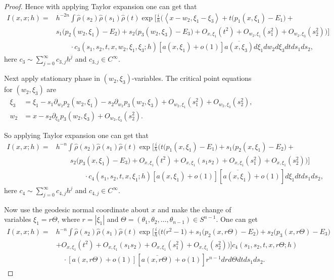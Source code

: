 \documentclass[10pt,a4paper]{amsart}
\begin{document}
\begin{proof}
Hence with applying Taylor expansion one can get that
\begin{align*}
I (x,x; h)=&h^{-2n}\int \hat{\rho}(s_2)\hat{\rho}(s_1)\hat{\rho}(t)  \exp\Big[\frac{i}h\Big(\left<x-w_2, \xi_1-\xi_3\right>+t(p_1(x,\xi_1)-E_1\big)+ \nonumber \\
&  s_1\big(p_2(w_2,\xi_1)-E_2\big)+s_2\big( p_3(w_2,\xi_3)-E_3 \big)+O_{x,\xi_1}(t^2)+ O_{w_2,\xi_1}(s_1^2)+O_{w_2,\xi_3}(s_2^2) \Big)\Big] \nonumber\\
&\qquad \cdot c_3(s_1,s_2,t,x,w_2,\xi_1, \xi_3;h)[a(x, \xi_1)+o(1)] \overline{a(x, \xi_3)} d\xi_1 dw_2 d\xi_3 dt ds_1 ds_2,
\end{align*}
here $c_3\sim \sum_{j=0}^\infty c_{3,j} h^j$ and $c_{3,j}\in C^\infty$.

Next apply stationary phase in $(w_2, \xi_3)$-variables. The critical point equations for $(w_2,\xi_3)$ are
\begin{align}
\xi_3&=\xi_1-s_1\partial_{w_2} p_2(w_2,\xi_1)-s_2\partial_{w_2} p_3(w_2,\xi_3)+O_{w_2,\xi_1}(s_1^2)+ O_{w_2,\xi_3}(s_2^2),\\
w_2&=x-s_2\partial_{\xi_3} p_3(w_2,\xi_3)+ O_{w_2,\xi_3}(s_2^2).
\end{align}

So applying Taylor expansion one can get that
\begin{align}
I (x,x; h)=&h^{-n}\int \hat{\rho}(s_2)\hat{\rho}(s_1)\hat{\rho}(t)  \exp\Big[\frac{i}h\Big(t(p_1(x,\xi_1)-E_1\big)+ s_1\big(p_2(x,\xi_1)-E_2\big)+ \nonumber \\
&\qquad  s_2\big( p_3(x,\xi_1)-E_3 \big)+O_{x,\xi_1}(t^2)+O_{x,\xi_1}(s_1 s_2)+ O_{x,\xi_1}(s_1^2)+O_{x,\xi_1}(s_2^2) \Big)\Big] \nonumber\\
&\qquad\qquad \cdot c_4(s_1,s_2,t,x,\xi_1;h) [a(x, \xi_1)+o(1)] [\overline{a(x, \xi_1)}+o(1)] d\xi_1 dt ds_1 ds_2,
\end{align}
here $c_4\sim \sum_{j=0}^\infty c_{4,j} h^j$ and $c_{4,j}\in C^\infty$.

Now use the geodesic normal coordinate about $x$ and make the change of variables $\xi_1=r\Theta$, where $r=|\xi_1|$ and $\Theta=(\theta_1,\theta_2,\dots,\theta_{n-1})\in S^{n-1}$. One can get
\begin{align}\label{tilde I'}
I (x, x; h)=& h^{-n}\int \hat{\rho}(s_2)\hat{\rho}(s_1)\hat{\rho}(t)  \exp\Big[\frac{i}h\Big( t (r^2-1\big)+s_1\big(p_2(x, r\Theta)-E_2\big)+s_2\big( p_3(x,r\Theta)-E_3 \big) \nonumber\\ 
&+O_{x,\xi_1}(t^2)+O_{x,\xi_1}(s_1 s_2)+ O_{x,\xi_1}(s_1^2)+O_{x,\xi_1}(s_2^2) \Big)\Big]c_4(s_1,s_2,t, x,r\Theta;h)\nonumber \\
&\quad\cdot[a(x, r\Theta)+o(1)] [\overline{a(x, r\Theta)}+o(1)] r^{n-1} dr d\Theta dt ds_1 ds_2.
\end{align}


\end{proof}
\end{document}
